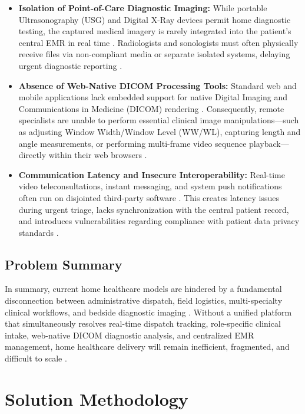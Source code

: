 \documentclass[lettersize,onecolumn,journal]{IEEEtran}
\begin{document}
	\begin{itemize}
		\item \textbf{Isolation of Point-of-Care Diagnostic Imaging:} While portable Ultrasonography (USG) and Digital X-Ray devices permit home diagnostic testing, the captured medical imagery is rarely integrated into the patient’s central EMR in real time \cite{pacs2001}. Radiologists and sonologists must often physically receive files via non-compliant media or separate isolated systems, delaying urgent diagnostic reporting \cite{pacs2001}.
		\item \textbf{Absence of Web-Native DICOM Processing Tools:} Standard web and mobile applications lack embedded support for native Digital Imaging and Communications in Medicine (DICOM) rendering \cite{dicom2021}. Consequently, remote specialists are unable to perform essential clinical image manipulations—such as adjusting Window Width/Window Level (WW/WL), capturing length and angle measurements, or performing multi-frame video sequence playback—directly within their web browsers \cite{cornerstone3d}.
		\item \textbf{Communication Latency and Insecure Interoperability:} Real-time video teleconsultations, instant messaging, and system push notifications often run on disjointed third-party software \cite{fette2011websocket, agorawebrtc}. This creates latency issues during urgent triage, lacks synchronization with the central patient record, and introduces vulnerabilities regarding compliance with patient data privacy standards \cite{agorawebrtc}.
	\end{itemize}
	
	\subsection{Problem Summary}
	In summary, current home healthcare models are hindered by a fundamental disconnection between administrative dispatch, field logistics, multi-specialty clinical workflows, and bedside diagnostic imaging \cite{srs2026}. Without a unified platform that simultaneously resolves real-time dispatch tracking, role-specific clinical intake, web-native DICOM diagnostic analysis, and centralized EMR management, home healthcare delivery will remain inefficient, fragmented, and difficult to scale \cite{srs2026, accv2016}.
	
	\section{Solution Methodology}
	
\end{document}
